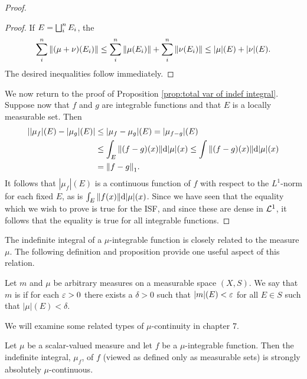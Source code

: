 \begin{proof}
\begin{proof}
If $E=\bigsqcup_i^nE_i$, the \[\sum_i^n\norm{(\mu+\nu)(E_i)}\leq\sum_i^n\norm{\mu(E_i)}+\sum_i^n\norm{\nu(E_i)}\leq|\mu|(E)+|\nu|(E).\] The desired inequalities follow immediately.
\end{proof}

We now return to the proof of Proposition \ref{prop:total var of indef integral}. Suppose now that $f$ and $g$ are integrable functions and that $E$ is a locally measurable set. Then
\begin{align*}
    ||\mu_f|(E)-|\mu_g|(E)|&\leq|\mu_f-\mu_g|(E)=|\mu_{f-g}|(E)\\
    &\leq\int_E\norm{(f-g)(x)}\dd|\mu|(x)\leq\int\norm{(f-g)(x)}\dd|\mu|(x)\\
    &=\norm{f-g}_1.
\end{align*}
It follows that $|\mu_f|(E)$ is a continuous function of $f$ with respect to the $L^1$-norm for each fixed $E$, as is $\int_E\norm{f(x)}\dd|\mu|(x)$. Since we have seen that the equality which we wish to prove is true for the ISF, and since these are dense in ${\cal L}^1$, it follows that the equality is true for all integrable functions.

\end{proof}

The indefinite integral of a $\mu$-integrable function is closely related to the measure $\mu$. The following definition and proposition provide one useful aspect of this relation.

\begin{definition}
Let $m$ and $\mu$ be arbitrary measures on a measurable space $(X,S)$. We say that $m$ is  if for each $\varepsilon>0$ there exists a $\delta>0$ such that $|m|(E)<\varepsilon$ for all $E\in S$ such that $|\mu|(E)<\delta$.
\end{definition}

We will examine some related types of $\mu$-continuity in chapter 7. %

\begin{proposition}\label{prop:indef int mu strong abs cts}
Let $\mu$ be a scalar-valued measure and let $f$ be a $\mu$-integrable function. Then the indefinite integral, $\mu_f$, of $f$ (viewed as defined only as measurable sets) is strongly absolutely $\mu$-continuous.
\end{proposition}

